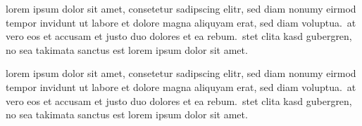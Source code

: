 \documentclass{article}
\date{September 14, 2013}
\begin{document}
\maketitle

\begin{multicols}{3}{

    lorem ipsum dolor sit amet, consetetur sadipscing elitr, sed diam nonumy eirmod
    tempor invidunt ut labore et dolore magna aliquyam erat, sed diam voluptua.\ at
    vero eos et accusam et justo duo dolores et ea rebum.\ stet clita kasd gubergren,
    no sea takimata sanctus est lorem ipsum dolor sit amet.\
    \closearticle

    
    \closearticle


    lorem ipsum dolor sit amet, consetetur sadipscing elitr, sed diam nonumy eirmod
    tempor invidunt ut labore et dolore magna aliquyam erat, sed diam voluptua.\ at
    vero eos et accusam et justo duo dolores et ea rebum.\ stet clita kasd gubergren,
    no sea takimata sanctus est lorem ipsum dolor sit amet.\

}
\end{multicols}

\begin{multicols}{2}{
    
    
    }
\end{multicols}
\end{document}
